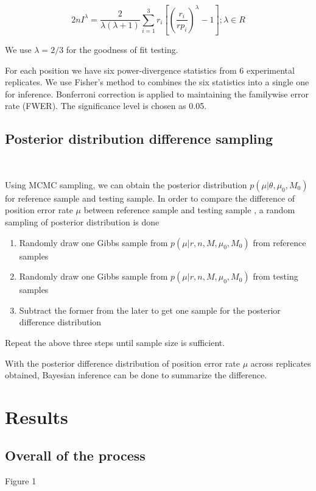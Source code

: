 \documentclass[11pt,reqno]{amsart}
\begin{document}
\begin{equation}
 2nI^\lambda = \frac{2}{\lambda(\lambda+1)}\sum_{i=1}^3 r_i \left[\left(\frac{r_i}{rp_i}\right)^\lambda-1\right];\lambda \in R
\end{equation}

We use $\lambda =2/3$ for the goodness of fit testing.

For each position we have six power-divergence statistics from 6 experimental replicates. We use Fisher's method to combines the six statistics into a single one for inference. Bonferroni correction is applied to maintaining the familywise error rate (FWER). The significance level is chosen as 0.05.

\subsection{Posterior distribution difference sampling}\

Using MCMC sampling, we can obtain the posterior distribution $p \left( \mu |\theta,\mu_0,M_0\right)$ for reference sample and testing sample. In order to compare the difference of position error rate $\mu$ between reference sample and testing sample , a random sampling of posterior distribution is done 

\begin{enumerate}
 \item Randomly  draw one Gibbs sample from $p \left( \mu |r, n, M, \mu_0, M_0\right)$ from reference samples
 \item Randomly draw one Gibbs sample from $p \left( \mu |r, n, M, \mu_0,M_0\right) $ from testing samples
 \item Subtract the former from the later to get one sample for the posterior difference distribution 
\end{enumerate}
Repeat the above three steps until sample size is sufficient.

With the posterior difference distribution of position error rate $\mu$ across replicates obtained, Bayesian inference can be done to summarize the difference. 


\section{Results}

\subsection{Overall of the process}
Figure 1 
\end{document}
